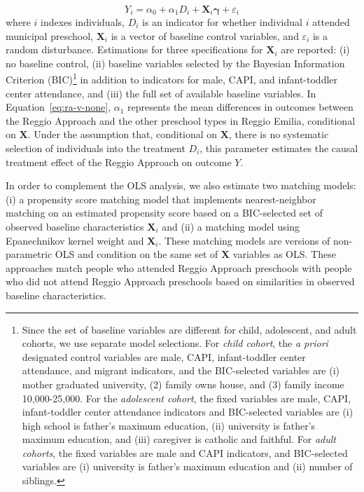 \begin{equation}
	Y_i = \alpha_0 + \alpha_1 D_i + \bm{X}_i \bm{\gamma} + \varepsilon_i
	\label{eq:ra-v-none}
\end{equation}
where $i$ indexes individuals, $D_i$ is an indicator for whether individual $i$ attended municipal preschool, $\bm{X}_i$ is a vector of baseline control variables, and $\varepsilon_i$ is a random disturbance. Estimations for three specifications for $\bm{X}_i$ are reported: (i) no baseline control, (ii) baseline variables selected by the Bayesian Information Criterion (BIC)\footnote{Since the set of baseline variables are different for child, adolescent, and adult cohorts, we use separate model selections. For \emph{child cohort}, the \emph{a priori} designated control variables are male, CAPI, infant-toddler center attendance, and migrant indicators, and the BIC-selected variables are (i) mother graduated university, (2) family owns house, and (3) family income 10,000-25,000. For the \emph{adolescent cohort}, the fixed variables are male, CAPI, infant-toddler center attendance indicators and BIC-selected variables are (i) high school is father's maximum education, (ii) university is father's maximum education, and (iii) caregiver is catholic and faithful. For \emph{adult cohorts}, the fixed variables are male and CAPI indicators, and BIC-selected variables are (i) university is father's maximum education and (ii) number of siblings.} in addition to indicators for male, CAPI, and infant-toddler center attendance, and (iii) the full set of available baseline variables. In Equation~\eqref{eq:ra-v-none}, $\alpha_1$ represents the mean differences in outcomes between the Reggio Approach and the other preschool types in Reggio Emilia, conditional on $\bm{X}$. Under the assumption that, conditional on $\bm{X}$, there is no systematic selection of individuals into the treatment $D_i$, this parameter estimates the causal treatment effect of the Reggio Approach on outcome $Y$.

In order to complement the OLS analysis, we also estimate two matching models: (i) a propensity score matching model that implements nearest-neighbor matching on an estimated propensity score based on a BIC-selected set of observed baseline characteristics $\boldsymbol{X}_i$ and (ii) a  matching model using Epanechnikov kernel weight and $\boldsymbol{X}_i$. These matching models are versions of non-parametric OLS and condition on the same set of $\bm{X}$ variables as OLS. These approaches match people who attended Reggio Approach preschools with people who did not attend Reggio Approach preschools based on similarities in observed baseline characteristics. 

